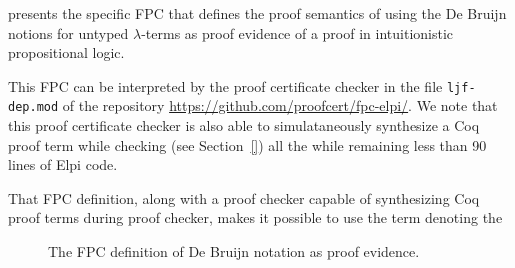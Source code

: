  presents the specific FPC that defines the
proof semantics of using the De Bruijn notions for untyped
$\lambda$-terms as proof evidence of a proof in intuitionistic
propositional logic.


This FPC can be interpreted by the proof
certificate checker in the file \verb+ljf-dep.mod+ of the repository
\url{https://github.com/proofcert/fpc-elpi/}.
We note that this proof certificate checker is also able to
simulataneously synthesize a Coq proof term while checking (see
Section~\ref{}) all the while remaining less than 90 lines of Elpi
code. 






  That FPC definition, along with a proof checker
capable of synthesizing Coq proof terms during proof checker, makes it
possible to use the term denoting the 


\begin{figure}


\caption{The FPC definition of De Bruijn notation as proof evidence.}
\label{fig:debruijn}
\end{figure}

\newpage



